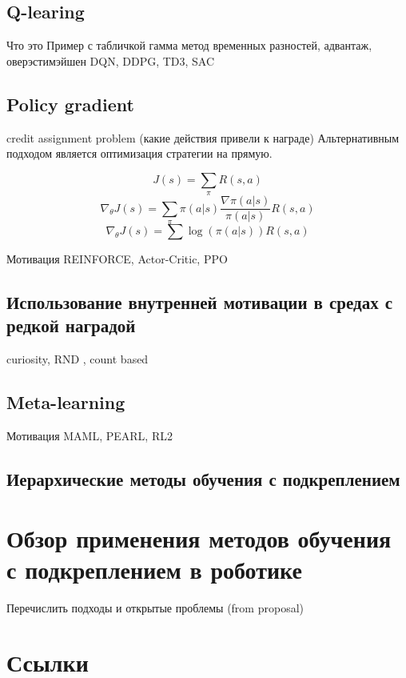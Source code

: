 \subsection{Q-learing}
Что это
Пример с табличкой
гамма
метод временных разностей, адвантаж, оверэстимэйшен 
DQN, DDPG, TD3, SAC

\subsection{Policy gradient}
credit assignment problem (какие действия привели к награде)
Альтернативным подходом является оптимизация стратегии на прямую. 

$$J(s) = \sum_{\pi} R(s,a )$$
$$\nabla_{\theta} J(s) = \sum_{\pi} \pi(a|s)\frac{\nabla \pi(a|s)}{\pi(a|s)}R(s,a )$$
$$\nabla_{\theta} J(s) = \sum \log(\pi(a|s))R(s,a )$$

Мотивация 
REINFORCE, Actor-Critic, PPO

\subsection{Использование внутренней мотивации в средах с редкой наградой}
curiosity, RND , count based 

\subsection{Meta-learning}
Мотивация MAML, PEARL, RL2

\subsection{Иерархические методы обучения с подкреплением}

\section{Обзор применения методов обучения с подкреплением в роботике}\label{sec:ch1/sec2}
Перечислить подходы и открытые проблемы (from proposal)


\section{Ссылки}\label{sec:ch1/sec2}


\FloatBarrier
